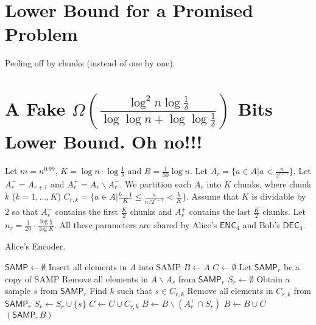 \documentclass[10pt]{article}
\newcommand{\samp}{\textsf{SAMP}\xspace}
\newcommand{\enc}{\textsf{ENC}\xspace}
\newcommand{\dec}{\textsf{DEC}\xspace}
\begin{document}
\section{Lower Bound for a Promised Problem}
Peeling off by chunks (instead of one by one). 

\section{A Fake $\Omega(\frac{\log^2 n\log{\frac{1}{\delta}}}{\log\log n+\log\log \frac{1}{\delta}})$ Bits Lower Bound. Oh no!!!}

Let $m=n^{0.99}$, $K=\log n \cdot \log \frac{1}{\delta}$ and $R=\frac{1}{50}\log n$. Let $A_r = \{a\in A|a<\frac{n}{2^{r-1}}\}$. Let $A_r^{-}=A_{r+1}$ and $A_r^{+}=A_r \backslash A_r^{-}$. We partition each $A_r$ into $K$ chunks, where chunk $k$ ($k=1,\ldots,K$) $C_{r,k}=\{a\in A|\frac{k-1}{K} \le \frac{a}{n/2^{r-1}} < \frac{k}{K} \}$. Assume that $K$ is dividable by $2$ so that $A_r^{-}$ contains the first $\frac{K}{2}$ chunks and $A_r^{+}$ contains the last $\frac{K}{2}$ chunks. Let $n_r=\frac{1}{20} \cdot \frac{\log \frac{1}{\delta}}{\log K}$.
All these parameters are shared by Alice's $\enc_4$ and Bob's $\dec_4$. 

\begin{algorithm}[H]
  \caption{Alice's Encoder.}
  \begin{algorithmic}[1]
    \Procedure{$\enc_4$}{$A$}
    \State $\samp \leftarrow \emptyset$
    \State Insert all elements in $A$ into \samp
    \State $B\leftarrow A$
    \State $C\leftarrow \emptyset$
      \State Let $\samp_r$ be a copy of \samp
      \State Remove all elements in $A\backslash A_r$ from $\samp_r$
      \State $S_r\leftarrow \emptyset$
        \State Obtain a sample $s$ from $\samp_r$
        \State Find $k$ such that $s\in C_{r,k}$
        \State Remove all elements in $C_{r,k}$ from $\samp_r$
        \State $S_r\leftarrow S_r \cup \{s\}$
          \State $C\leftarrow C \cup C_{r,k}$
        \EndIf
      \EndFor
      \State $B \leftarrow B \backslash (A_r^{+}\cap S_r)$
    \EndFor
    \State $B\leftarrow B \cup C$
    \State \Return $(\samp, B)$ 
    \EndProcedure
  \end{algorithmic}
\end{algorithm}
\end{document}
